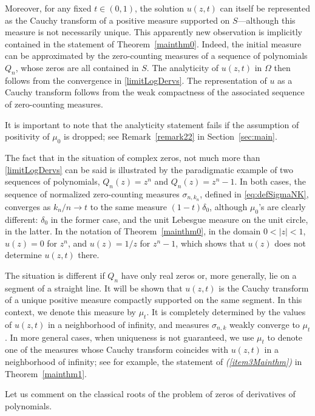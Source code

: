 \documentclass[reqno,11pt]{amsart}
\theoremstyle{plain}
\theoremstyle{definition}
\theoremstyle{remark}
\numberwithin{equation}{section}
\numberwithin{equation}{section}
\begin{document}
Moreover, for any fixed $t \in (0,1)$, the solution $u(z,t)$ can itself be represented as the Cauchy transform of a positive measure supported on $S$---although this measure is not necessarily unique. This apparently new observation is implicitly contained in the statement of Theorem~\ref{mainthm0}. Indeed, the initial measure can be approximated by the zero-counting measures of a sequence of polynomials $Q_n$, whose zeros are all contained in $S$. The analyticity of $u(z,t)$ in $\Omega$ then follows from the convergence in \eqref{limitLogDervs}. The representation of $u$ as a Cauchy transform follows from the weak compactness of the associated sequence of zero-counting measures.
	
It is important to note that the analyticity statement fails if the assumption of positivity of $\mu_0$ is dropped; see Remark~\ref{remark22} in Section~\ref{sec:main}.

The fact that in the situation of complex zeros, not much more than \eqref{limitLogDervs} can be said is illustrated by the paradigmatic example of two sequences of polynomials, $Q_n(z)=z^n$ and $Q_n(z)=z^n-1$. In both cases, the sequence of normalized zero-counting measures $\sigma_{n,k_n}$, defined in \eqref{eq:defSigmaNK}, converges as $k_n/n\to t$ to the same measure $(1-t)\delta_0$, although $\mu_0$'s are clearly different: $\delta_0$ in the former case, and the unit Lebesgue measure on the unit circle, in the latter. In the notation of Theorem~\ref{mainthm0}, in the domain $0<|z|<1$, $u(z)=0$ for $z^n$, and $u(z)=1/z$ for $z^n-1$, which shows that $u(z)$ does not determine $u(z,t)$ there.

The situation is different if $Q_n$ have only real zeros or, more generally, lie on a segment of a straight line. It will be shown that  $u(z,t)$ is the Cauchy transform of a unique positive measure compactly supported on the same segment. In this context, we denote this measure by $\mu_t$. It is completely determined by the values of $u(z,t)$ in a neighborhood of infinity, and measures $\sigma_{n,k}$ weakly converge to $\mu_t$. In more general cases, when uniqueness is not guaranteed, we use $\mu_t$ to denote one of the measures whose Cauchy transform coincides with $u(z,t)$ in a neighborhood of infinity; see for example, the statement of \textit{(\ref{item3Mainthm})} in Theorem~\ref{mainthm1}.

\medskip

Let us comment on the classical roots of the problem of zeros of derivatives of polynomials.
\end{document}
